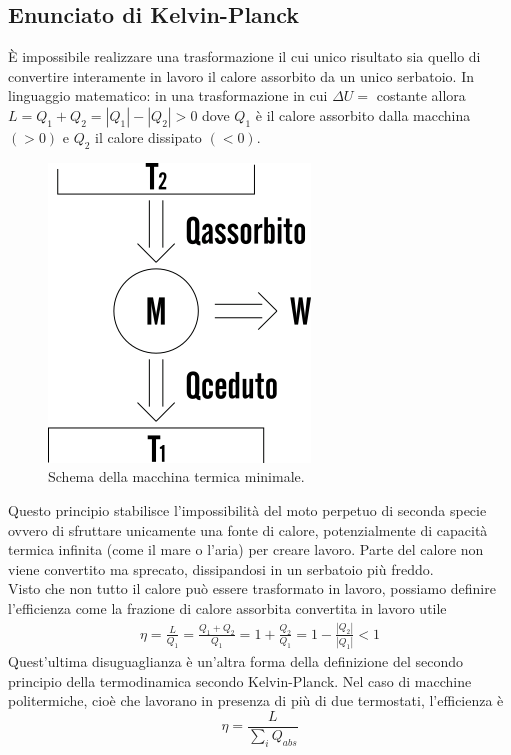 \documentclass[
10pt, %
a4paper, %
oneside, %
headinclude,footinclude, %
BCOR5mm, %
]{scrartcl}
\begin{document}
\subsection{Enunciato di Kelvin-Planck}
\begin{definition}
	È impossibile realizzare una trasformazione il cui unico risultato sia quello di convertire interamente in lavoro il calore assorbito da un unico serbatoio. In linguaggio matematico: in una trasformazione in cui $\Delta U =$ costante allora \(L = Q_1+Q_2 = |Q_1| - |Q_2|> 0\) dove $Q_1$ è il calore assorbito dalla macchina \((> 0)\) e $Q_2$ il calore dissipato \((< 0)\).
\end{definition}
\begin{figure}[h!]
	\centering
	\includegraphics[width=0.3\linewidth]{../images/macchina-termica}
	\caption{Schema della macchina termica minimale.}
	\label{fig:macchina-termica}
\end{figure}
\FloatBarrier
Questo principio stabilisce l'impossibilità del moto perpetuo di seconda specie ovvero di sfruttare unicamente una fonte di calore, potenzialmente di capacità termica infinita (come il mare o l'aria) per creare lavoro. Parte del calore non viene convertito ma sprecato, dissipandosi in un serbatoio più freddo. \\
Visto che non tutto il calore può essere trasformato in lavoro, possiamo definire l'efficienza come la frazione di calore assorbita convertita in lavoro utile
\begin{align*}
	\eta = \frac{L}{Q_1} = \frac{Q_1 + Q_2}{Q_1} = 1 + \frac{Q_2}{Q_1} = 1- \frac{|Q_2|}{|Q_1|}< 1
\end{align*}
Quest'ultima disuguaglianza è un'altra forma della definizione del secondo principio della termodinamica secondo Kelvin-Planck. Nel caso di macchine politermiche, cioè che lavorano in presenza di più di due termostati, l'efficienza è 
\[\eta = \frac{L}{\sum_i Q_{abs}}\]
\end{document}
